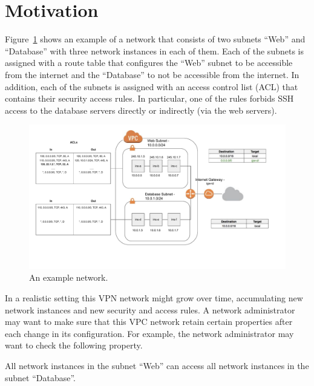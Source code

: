 \section{Motivation}
\label{sect:aws/motivation}

Figure~\ref{ex:vpc} shows an example of a network that consists of two subnets ``Web'' and ``Database'' with three network instances in each of them. Each of the subnets is assigned with a route table that configures the ``Web'' subnet to be accessible from the internet and the ``Database'' to not be accessible from the internet. In addition, each of the subnets is assigned with an access control list (ACL) that contains their security access rules. In particular, one of the rules forbids SSH access to the database servers directly or indirectly (via the web servers). 

\begin{figure}[th]
\centering\includegraphics[width=1.0\textwidth]{./aws/fig/vpc.pdf}
\caption{An example network\label{ex:vpc}.}
\end{figure}

In a realistic setting this VPN network might grow over time, accumulating new network instances and new security and access rules. A network administrator may want to make sure that this VPC network retain certain properties after each change in its configuration. For example, the network administrator may want to check the following property.
\begin{example}\label{prop:bool-property}
All network instances in the subnet ``Web'' can access all network instances in the subnet ``Database''.
\end{example}

